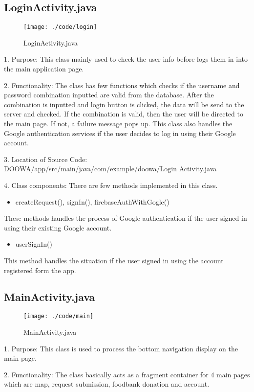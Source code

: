 \documentclass[conference]{IEEEtran}
\begin{document}
\subsection{LoginActivity.java}
\begin{figure}[h!]
\texttt{[image: ./code/login]}
\centering
\caption{LoginActivity.java}
\end{figure}
1. Purpose: This class mainly used to check the user info before logs them in into the main application page.\break
\par 2. Functionality: The class has few functions which checks if the username and password combination inputted are valid from the database. After the combination is inputted and login button is clicked, the data will be send to the server and checked. If the combination is valid, then the user will be directed to the main page. If not, a failure message pops up. This class also handles the Google authentication services if the user decides to log in using their Google account.\break

3. Location of Source Code: DOOWA/app/src/main/java/com/example/doowa/Login Activity.java\break

4. Class components: There are few methods implemented in this class.
\begin{itemize}
\item createRequest(), signIn(), firebaseAuthWithGogle()
\end{itemize}
These methods handles the process of Google authentication if the user signed in using their existing Google account.
\begin{itemize}
\item userSignIn()
\end{itemize}
This method handles the situation if the user signed in using the account registered form the app.
\break
\subsection{MainActivity.java}
\begin{figure}[h!]
\texttt{[image: ./code/main]}
\centering
\caption{MainActivity.java}
\end{figure}
1. Purpose: This class is used to process the bottom navigation display on the main page.\break

\par 2. Functionality: The class basically acts as a fragment container for 4 main pages which are map, request submission, foodbank donation and account.  \break
\end{document}

